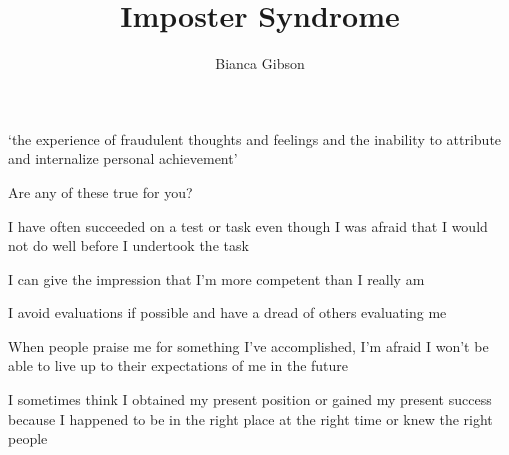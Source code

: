 \documentclass[aspectratio=169]{beamer}
\title{Imposter Syndrome}
\author{Bianca Gibson}
\institute{Pycon AU 2016}
\date{}
\begin{document}
\frame{\titlepage}

\begin{frame}
  \begin{center}
    \Huge `the experience of fraudulent thoughts and feelings and the inability to attribute and internalize personal achievement'
    \\ \small \cite{hh15}
  \end{center}
\end{frame}

\begin{frame}
  \begin{center}
    \Huge Are any of these true for you?
    \\ \small \cite{clance85}
  \end{center}
\end{frame}

\begin{frame}
  \begin{center}
    \Huge  I have often succeeded on a test or task even though I was afraid that I would not do well before I undertook the task
  \end{center}
\end{frame}

\begin{frame}
  \begin{center}
    \Huge  I can give the impression that I’m more competent than I really am
  \end{center}
\end{frame}

\begin{frame}
  \begin{center}
    \Huge  I avoid evaluations if possible and have a dread of others evaluating me
  \end{center}
\end{frame}

\begin{frame}
  \begin{center}
    \Huge  When  people  praise  me  for  something  I’ve  accomplished,  I’m  afraid  I  won’t  be able to live up to their expectations of me in the future
  \end{center}
\end{frame}

\begin{frame}
  \begin{center}
    \Huge  I sometimes think I obtained my present position or gained my present success because I happened to be in the right place at the right time or knew the right people
  \end{center}
\end{frame}
\end{document}
